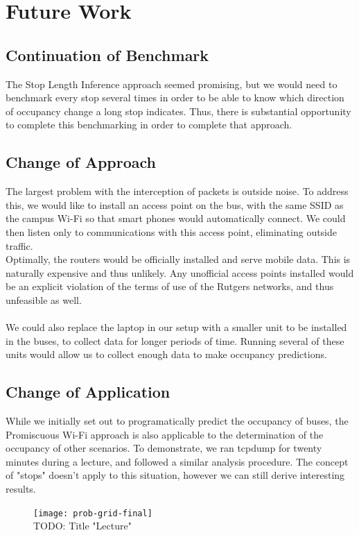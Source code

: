 \documentclass[letterpaper,abstract=on,titlepage=false]{scrreprt}
\begin{document}
\section*{Future Work}
\subsection*{Continuation of Benchmark}
	The Stop Length Inference approach seemed promising, but we would need to benchmark every stop several times in order to be able to know which direction of occupancy change a long stop indicates. Thus, there is substantial opportunity to complete this benchmarking in order to complete that approach.
\subsection*{Change of Approach}
	The largest problem with the interception of packets is outside noise.
	To address this, we would like to install an access point on the bus, with the same SSID as the campus Wi-Fi so that smart phones would automatically connect.
	We could then listen only to communications with this access point, eliminating outside traffic.
	\\
	Optimally, the routers would be officially installed and serve mobile data.
	This is naturally expensive and thus unlikely.
	Any unofficial access points installed would be an explicit violation of the terms of use of the Rutgers networks, and thus unfeasible as well.
	\\\\
	We could also replace the laptop in our setup with a smaller unit to be installed in the buses, to collect data for longer periods of time.
	Running several of these units would allow us to collect enough data to make occupancy predictions.

\subsection*{Change of Application}
	While we initially set out to programatically predict the occupancy of buses, the Promiscuous Wi-Fi approach is also applicable to the determination of the occupancy of other scenarios.
	To demonstrate, we ran tcpdump for twenty minutes during a lecture, and followed a similar analysis procedure.
	The concept of "stops" doesn't apply to this situation, however we can still derive interesting results.

	\begin{figure}[H]
		\texttt{[image: prob-grid-final]}
		\centering
		\\TODO: Title "Lecture"
	\end{figure}
\end{document}
